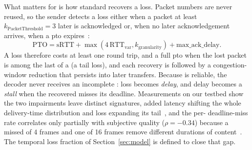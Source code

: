 What matters for \crystal is how standard \quic recovers a loss. Packet
numbers are never reused, so the sender detects a loss either when a
packet at least $k_{\mathrm{PacketThreshold}}=3$ later is acknowledged
or, when no later acknowledgement arrives, when a \gls{pto} expires~\cite{rfc9002}:
\begin{equation}
  \mathrm{PTO} = \mathrm{sRTT} + \max(4\,\mathrm{RTT}_{\mathrm{var}},
  k_{\mathrm{granularity}}) + \mathrm{max\_ack\_delay}.
  \label{eq:pto}
\end{equation}
A loss therefore costs at least one round trip, and a full \gls{pto}
when the lost packet is among the last of a \gof (a tail loss), and
each recovery is followed by a congestion-window reduction that
persists into later transfers. Because \quic is reliable, the decoder
never receives an incomplete \gof: loss becomes \emph{delay}, and delay
becomes a \emph{stall} when the recovered \gof misses its deadline.
Measurements on our testbed show the two impairments leave distinct
signatures, added latency shifting the whole delivery-time distribution
and loss expanding its tail~\cite{vquest2026}, and the per-\gof
deadline-miss rate correlates only partially with subjective quality
($\rho = -0.34$) because a missed \gof of 4 frames and one of 16 frames
remove different durations of content~\cite{mosaic2026}. The temporal
loss fraction of Section~\ref{sec:model} is defined to close that gap.

